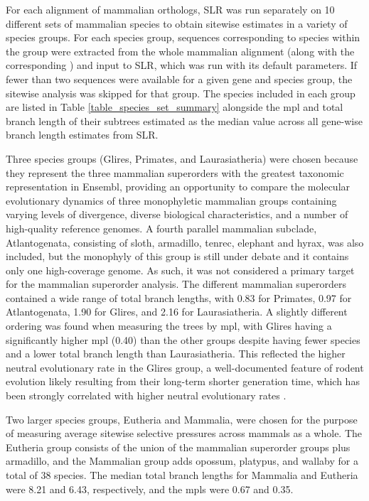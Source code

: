 For each alignment of mammalian orthologs, SLR was run separately on 10
different sets of mammalian species to obtain sitewise estimates in a
variety of species groups. For each species group, sequences
corresponding to species within the group were extracted from the
whole mammalian alignment (along with the corresponding \subtr) and
input to SLR, which was run with its default parameters. If fewer than
two sequences were available for a given gene and species group, the
sitewise analysis was skipped for that group. The species included in
each group are listed in Table \ref{table_species_set_summary}
alongside the \ac{mpl} and total branch length of their subtrees
estimated as the median value across all \ntrees gene-wise \ds branch
length estimates from SLR.

Three species groups (Glires, Primates, and Laurasiatheria) were
chosen because they represent the three mammalian superorders with the
greatest taxonomic representation in Ensembl, providing an opportunity
to compare the molecular evolutionary dynamics of three monophyletic
mammalian groups containing varying levels of divergence, diverse
biological characteristics, and a number of high-quality reference
genomes. A fourth parallel mammalian subclade, Atlantogenata,
consisting of sloth, armadillo, tenrec, elephant and hyrax, was also
included, but the monophyly of this group is still under debate
\citep{Murphy2007,Churakov2009} and it contains only one high-coverage
genome. As such, it was not considered a primary target for the
mammalian superorder analysis. The different mammalian superorders
contained a wide range of total branch lengths, with 0.83 for
Primates, 0.97 for Atlantogenata, 1.90 for Glires, and 2.16 for
Laurasiatheria. A slightly different ordering was found when measuring
the trees by \ac{mpl}, with Glires having a significantly higher
\ac{mpl} (0.40) than the other groups despite having fewer species and
a lower total branch length than Laurasiatheria. This reflected the
higher neutral evolutionary rate in the Glires group, a
well-documented feature of rodent evolution likely resulting from
their long-term shorter generation time, which has been strongly
correlated with higher neutral evolutionary rates
\citep{Nikolaev2007,Smith2008}.

Two larger species groups, Eutheria and Mammalia, were chosen for the
purpose of measuring average sitewise selective pressures across
mammals as a whole. The Eutheria group consists of the union of the
mammalian superorder groups plus armadillo, and the Mammalian group
adds opossum, platypus, and wallaby for a total of 38 species. The
median total branch lengths for Mammalia and Eutheria were 8.21 and
6.43, respectively, and the \ac{mpl}s were 0.67 and 0.35.

